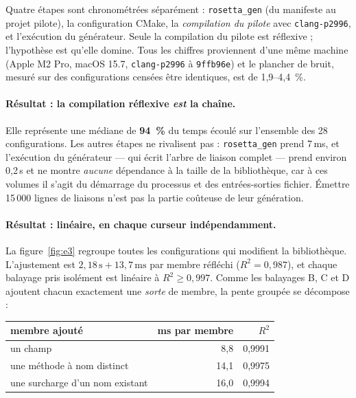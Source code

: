 \documentclass[11pt,a4paper]{article}
\newcommand{\code}[1]{\texttt{\small #1}}
\begin{document}
Quatre étapes sont chronométrées séparément : \code{rosetta\_gen} (du manifeste
au projet pilote), la configuration CMake, la \emph{compilation du pilote} avec
\code{clang-p2996}, et l'exécution du générateur. Seule la compilation du pilote
est réflexive ; l'hypothèse est qu'elle domine. Tous les chiffres proviennent
d'une même machine (Apple M2 Pro, macOS 15.7, \code{clang-p2996} à
\code{9ffb96e}) et le plancher de bruit, mesuré sur des configurations censées
être identiques, est de 1,9--4,4~\%.

\paragraph{Résultat : la compilation réflexive \emph{est} la chaîne.} Elle
représente une médiane de \textbf{94~\%} du temps écoulé sur l'ensemble des 28
configurations. Les autres étapes ne rivalisent pas : \code{rosetta\_gen} prend
7\,ms, et l'exécution du générateur --- qui écrit l'arbre de liaison complet ---
prend environ 0,2\,s et ne montre \emph{aucune} dépendance à la taille de la
bibliothèque, car à ces volumes il s'agit du démarrage du processus et des
entrées-sorties fichier. Émettre 15\,000 lignes de liaisons n'est pas la partie
coûteuse de leur génération.

\paragraph{Résultat : linéaire, en chaque curseur indépendamment.} La
figure~\ref{fig:e3} regroupe toutes les configurations qui modifient la
bibliothèque. L'ajustement est $2{,}18\,\text{s} + 13{,}7\,\text{ms}$ par membre
réfléchi ($R^2 = 0{,}987$), et chaque balayage pris isolément est linéaire à
$R^2 \ge 0{,}997$. Comme les balayages B, C et D ajoutent chacun exactement une
\emph{sorte} de membre, la pente groupée se décompose :

\begin{center}\small
\begin{tabular}{lrr}
\toprule
membre ajouté & ms par membre & $R^2$ \\
\midrule
un champ                         & 8,8  & 0,9991 \\
une méthode à nom distinct       & 14,1 & 0,9975 \\
une surcharge d'un nom existant  & 16,0 & 0,9994 \\
\bottomrule
\end{tabular}
\end{center}
\end{document}

